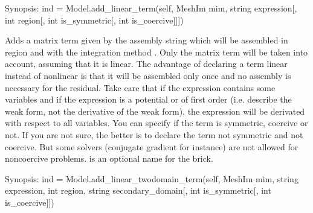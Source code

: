 \documentclass[a4paper,11pt,english]{sphinxmanual}
\begin{document}
\begin{fulllineitems}

\begin{fulllineitems}
\label{\detokenize{python/cmdref_Model:getfem.Model.add_linear_term}}
Synopsis: ind = Model.add\_linear\_term(self, MeshIm mim, string expression{[}, int region{[}, int is\_symmetric{[}, int is\_coercive{]}{]}{]})

Adds a matrix term given by the assembly string  which will
be assembled in region  and with the integration method .
Only the matrix term will be taken into account, assuming that it is
linear.
The advantage of declaring a term linear instead of nonlinear is that
it will be assembled only once and no assembly is necessary for the
residual.
Take care that if the expression contains some variables and if the
expression is a potential or of first order (i.e. describe the weak
form, not the derivative of the weak form), the expression will be
derivated with respect to all variables.
You can specify if the term is symmetric, coercive or not.
If you are not sure, the better is to declare the term not symmetric
and not coercive. But some solvers (conjugate gradient for instance)
are not allowed for non\sphinxhyphen{}coercive problems.
 is an optional name for the brick.

\end{fulllineitems}


\begin{fulllineitems}
\label{\detokenize{python/cmdref_Model:getfem.Model.add_linear_twodomain_term}}
Synopsis: ind = Model.add\_linear\_twodomain\_term(self, MeshIm mim, string expression, int region, string secondary\_domain{[}, int is\_symmetric{[}, int is\_coercive{]}{]})


\end{fulllineitems}
\end{fulllineitems}
\end{document}
